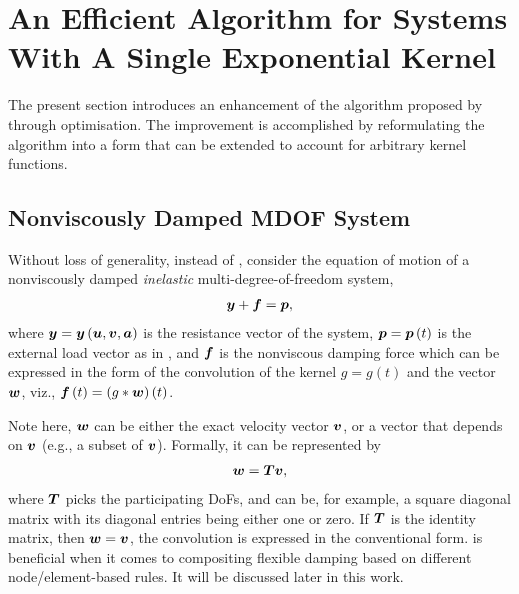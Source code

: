 \section{An Efficient Algorithm for Systems With A Single Exponential Kernel}\label{sec:single}
The present section introduces an enhancement of the algorithm proposed by \citet{Adhikari2004} through optimisation. The improvement is accomplished by reformulating the algorithm into a form that can be extended to account for arbitrary kernel functions.
\subsection{Nonviscously Damped MDOF System}
Without loss of generality, instead of , consider the equation of motion of a nonviscously damped \textit{inelastic} multi-degree-of-freedom system,
\begin{gather}\label{eq:eom}
\bm{y}+\bm{f}=\bm{p},
\end{gather}
where $\bm{y}=\bm{y}\left(\bm{u},\bm{v},\bm{a}\right)$ is the resistance vector of the system, $\bm{p}=\bm{p}\left(t\right)$ is the external load vector as in , and $\bm{f}$ is the nonviscous damping force which can be expressed in the form of the convolution of the kernel $g=g\left(t\right)$ and the vector $\bm{w}$, viz., $\bm{f}\left(t\right)=\left(g*\bm{w}\right)\left(t\right)$.

Note here, $\bm{w}$ can be either the exact velocity vector $\bm{v}$, or a vector that depends on $\bm{v}$ (e.g., a subset of $\bm{v}$). Formally, it can be represented by
\begin{gather}\label{eq:wv}
\bm{w}=\bm{T}\bm{v},
\end{gather}
where $\bm{T}$ picks the participating DoFs, and can be, for example, a square diagonal matrix with its diagonal entries being either one or zero. If $\bm{T}$ is the identity matrix, then $\bm{w}=\bm{v}$, the convolution is expressed in the conventional form.  is beneficial when it comes to compositing flexible damping based on different node/element-based rules. It will be discussed later in this work.
